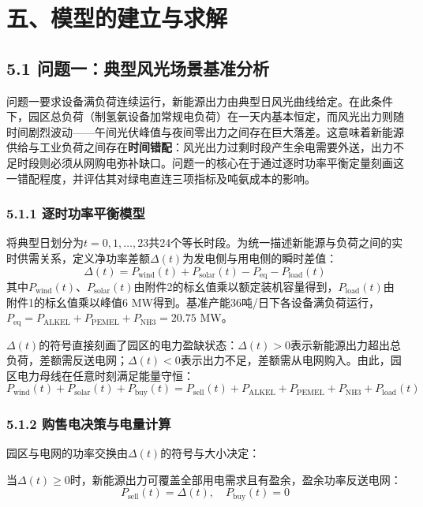\documentclass[zihao=-4,a4paper]{ctexart} %
\begin{document}
	\section*{五、模型的建立与求解}
	
	
	\subsection*{5.1 问题一：典型风光场景基准分析}
	
	问题一要求设备满负荷连续运行，新能源出力由典型日风光曲线给定。在此条件下，园区总负荷（制氢氨设备加常规电负荷）在一天内基本恒定，而风光出力则随时间剧烈波动——午间光伏峰值与夜间零出力之间存在巨大落差。这意味着新能源供给与工业负荷之间存在\textbf{时间错配}：风光出力过剩时段产生余电需要外送，出力不足时段则必须从网购电弥补缺口。问题一的核心在于通过逐时功率平衡定量刻画这一错配程度，并评估其对绿电直连三项指标及吨氨成本的影响。
	
	\subsubsection*{5.1.1 逐时功率平衡模型}
	将典型日划分为$t=0,1,\dots,23$共24个等长时段。为统一描述新能源与负荷之间的实时供需关系，定义净功率差额$\Delta(t)$为发电侧与用电侧的瞬时差值：
	\begin{equation}
		\Delta(t) = P_{\text{wind}}(t) + P_{\text{solar}}(t) - P_{\text{eq}} - P_{\text{load}}(t)
		\label{eq:delta}
	\end{equation}
	其中$P_{\text{wind}}(t)$、$P_{\text{solar}}(t)$由附件2的标幺值乘以额定装机容量得到，$P_{\text{load}}(t)$由附件1的标幺值乘以峰值6 MW得到。基准产能36吨/日下各设备满负荷运行，$P_{\text{eq}}=P_{\text{ALKEL}}+P_{\text{PEMEL}}+P_{\text{NH3}}=20.75$ MW。
	
	$\Delta(t)$的符号直接刻画了园区的电力盈缺状态：$\Delta(t)>0$表示新能源出力超出总负荷，差额需反送电网；$\Delta(t)<0$表示出力不足，差额需从电网购入。由此，园区电力母线在任意时刻满足能量守恒：
	\begin{equation}
		P_{\text{wind}}(t) + P_{\text{solar}}(t) + P_{\text{buy}}(t) = P_{\text{sell}}(t) + P_{\text{ALKEL}} + P_{\text{PEMEL}} + P_{\text{NH3}} + P_{\text{load}}(t)
		\label{eq:balance}
	\end{equation}
	\subsubsection*{5.1.2 购售电决策与电量计算}
	园区与电网的功率交换由$\Delta(t)$的符号与大小决定：\par
	当$\Delta(t) \geq 0$时，新能源出力可覆盖全部用电需求且有盈余，盈余功率反送电网：
	\begin{equation}
		P_{\text{sell}}(t) = \Delta(t),\quad P_{\text{buy}}(t) = 0
		\label{eq:sell}
	\end{equation}
	
\end{document}
